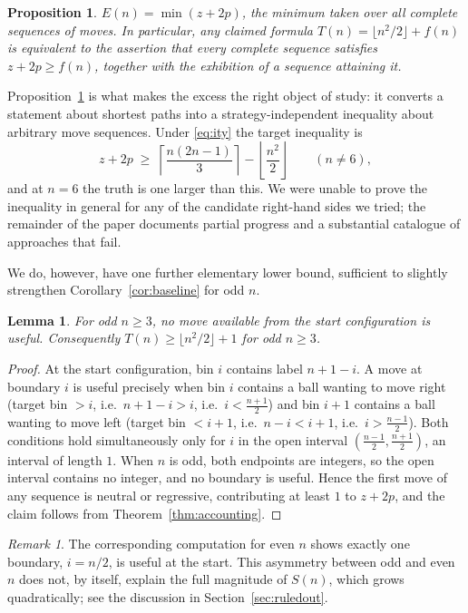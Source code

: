 \documentclass[11pt]{amsart}
\theoremstyle{plain}
\newtheorem{lemma}[theorem]{Lemma}
\newtheorem{proposition}[theorem]{Proposition}
\theoremstyle{definition}
\theoremstyle{remark}
\newtheorem{remark}[theorem]{Remark}
\begin{document}
\begin{proposition}
\label{prop:reduction}
$E(n) = \min (z+2p)$, the minimum taken over all complete sequences of moves. In particular, any claimed formula $T(n)=\lfloor n^2/2\rfloor + f(n)$ is equivalent to the assertion that every complete sequence satisfies $z+2p\ge f(n)$, together with the exhibition of a sequence attaining it.
\end{proposition}

Proposition~\ref{prop:reduction} is what makes the excess the right object of study: it converts a statement about shortest paths into a strategy-independent inequality about arbitrary move sequences. Under \eqref{eq:ity} the target inequality is
\[
z+2p \;\ge\; \left\lceil\frac{n(2n-1)}{3}\right\rceil - \left\lfloor\frac{n^2}{2}\right\rfloor \qquad (n\neq 6),
\]
and at $n=6$ the truth is one larger than this. We were unable to prove the inequality in general for any of the candidate right-hand sides we tried; the remainder of the paper documents partial progress and a substantial catalogue of approaches that fail.

We do, however, have one further elementary lower bound, sufficient to slightly strengthen Corollary~\ref{cor:baseline} for odd $n$.

\begin{lemma}
\label{lem:oddstart}
For odd $n\ge 3$, no move available from the start configuration is useful. Consequently $T(n)\ge \lfloor n^2/2\rfloor + 1$ for odd $n\ge 3$.
\end{lemma}

\begin{proof}
At the start configuration, bin $i$ contains label $n+1-i$. A move at boundary $i$ is useful precisely when bin $i$ contains a ball wanting to move right (target bin $>i$, i.e.\ $n+1-i>i$, i.e.\ $i<\frac{n+1}{2}$) and bin $i+1$ contains a ball wanting to move left (target bin $<i+1$, i.e.\ $n-i<i+1$, i.e.\ $i>\frac{n-1}{2}$). Both conditions hold simultaneously only for $i$ in the open interval $\left(\frac{n-1}{2},\frac{n+1}{2}\right)$, an interval of length $1$. When $n$ is odd, both endpoints are integers, so the open interval contains no integer, and no boundary is useful. Hence the first move of any sequence is neutral or regressive, contributing at least $1$ to $z+2p$, and the claim follows from Theorem~\ref{thm:accounting}.
\end{proof}

\begin{remark}
The corresponding computation for even $n$ shows exactly one boundary, $i=n/2$, is useful at the start. This asymmetry between odd and even $n$ does not, by itself, explain the full magnitude of $S(n)$, which grows quadratically; see the discussion in Section~\ref{sec:ruledout}.
\end{remark}
\end{document}
